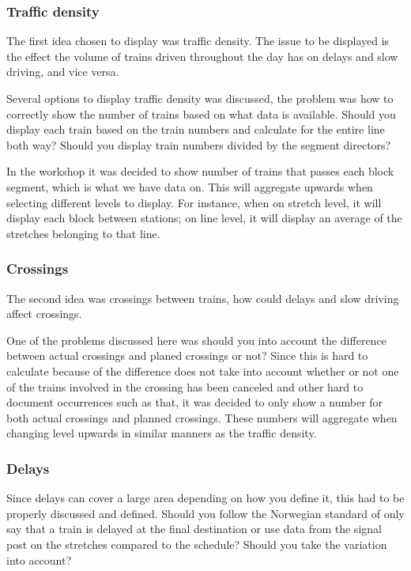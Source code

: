 \subsubsection{Traffic density} %
\label{ssub:traffic_density}
The first idea chosen to display was traffic density. The issue to be displayed
is the effect the volume of trains driven throughout the day has on delays and
slow driving, and vice versa.

Several options to display traffic density was discussed, the problem was how
to correctly show the number of trains based on what data is available. Should
you display each train based on the train numbers and calculate for the entire
line both way? Should you display train numbers divided by the segment
directors? 

In the workshop it was decided to show number of trains that passes each block
segment, which is what we have data on. This will aggregate upwards when
selecting different levels to display. For instance, when on stretch level, it
will display each block between stations; on line level, it will display an
average of the stretches belonging to that line.


\subsubsection{Crossings} %
\label{ssub:crossings}
The second idea was crossings between trains, how could delays and slow 
driving affect crossings. 

One of the problems discussed here was should you into account the difference
between actual crossings and planed crossings or not? Since this is hard to
calculate because of the difference does not take into account whether or not
one of the trains involved in the crossing has been canceled and other hard to
document occurrences such as that, it was decided to only show a number for
both actual crossings and planned crossings. These numbers will aggregate when
changing level upwards in similar manners as the traffic density. 

\subsubsection{Delays} %
\label{ssub:delays}
Since delays can cover a large area depending on how you define it, this had to
be properly discussed and defined. Should you follow the Norwegian standard
\cite{jernbaneverketPunklighetsTall} of only say that a train is delayed at the
final destination or use data from the signal post on the stretches compared to
the schedule? Should you take the variation into account?

